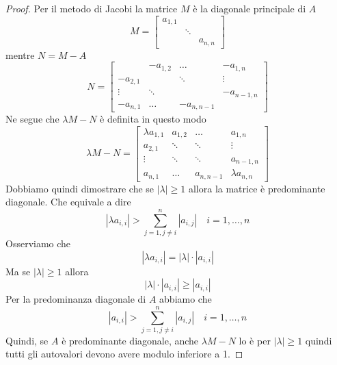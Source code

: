 \begin{theorem}
\begin{proof}
		Per il metodo di Jacobi la matrice $M$ è la diagonale principale di $A$
		\[
			M = \begin{bmatrix}
				a_{1,1} &        &         \\
				        & \ddots &         \\
				        &        & a_{n,n}
			\end{bmatrix}
		\]
		mentre $N = M - A$
		\[
			N = \begin{bmatrix}
				         & -a_{1,2} & \dots      & -a_{1,n}   \\
				-a_{2,1} &          & \ddots     & \vdots     \\
				\vdots   & \ddots   &            & -a_{n-1,n} \\
				-a_{n,1} & \dots    & -a_{n,n-1} &
			\end{bmatrix}
		\]
		Ne segue che $\lambda M - N$ è definita in questo modo
		\[
			\lambda M - N = \begin{bmatrix}
				\lambda a_{1,1} & a_{1,2} & \dots     & a_{1,n}         \\
				a_{2,1}         & \ddots  & \ddots    & \vdots          \\
				\vdots          & \ddots  & \ddots    & a_{n-1,n}       \\
				a_{n,1}         & \dots   & a_{n,n-1} & \lambda a_{n,n}
			\end{bmatrix}
		\]
		Dobbiamo quindi dimostrare che se $|\lambda| \geq 1$ allora la matrice è predominante diagonale. Che
		equivale a dire
		\[ |\lambda a_{i,i}| > \sum_{j=1, j \neq i}^{n} |a_{i,j}| \quad i=1, \dots, n \]
		Osserviamo che
		\[ |\lambda a_{i,i}| = |\lambda| \cdot |a_{i,i}| \]
		Ma se $|\lambda| \geq 1$ allora
		\[ |\lambda| \cdot |a_{i,i}| \geq |a_{i,i}| \]
		Per la predominanza diagonale di $A$ abbiamo che
		\[ |a_{i,i}| > \sum_{j=1, j \neq i}^n |a_{i,j}| \quad i=1, \dots, n \]
		Quindi, se $A$ è predominante diagonale, anche $\lambda M - N$ lo è per $|\lambda| \geq 1$ quindi tutti
		gli autovalori devono avere modulo inferiore a 1.


\end{proof}
\end{theorem}

